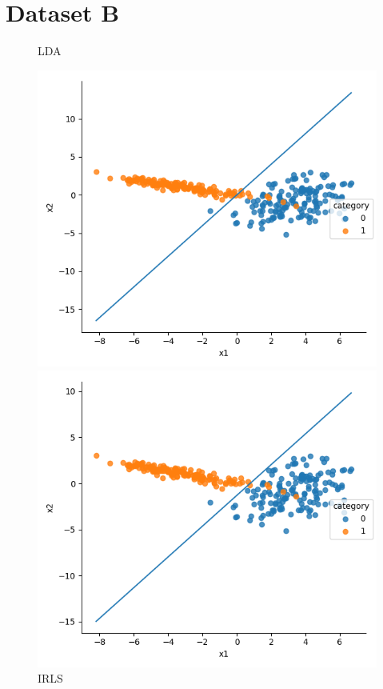 \documentclass[a4paper]{article}
\begin{document}
\section{Dataset B}
\begin{figure}[h]
\centering
\begin{minipage}{0,45\textwidth}
\caption{LDA}
\includegraphics[scale=.4]{b_lda.png}
\end{minipage}
\begin{minipage}{0,45\textwidth}
\caption{IRLS}
\includegraphics[scale=.4]{b_irls.png}

\end{minipage}
\end{figure}
\end{document}
